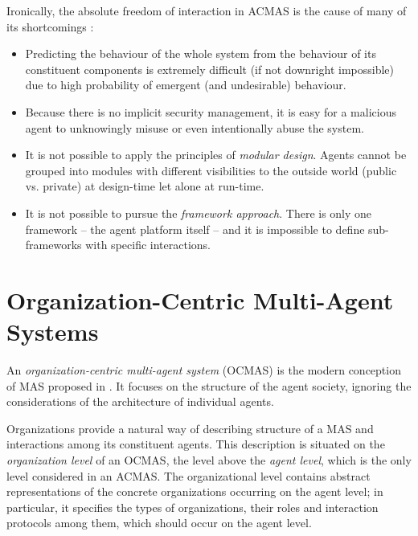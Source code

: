 Ironically, the absolute freedom of interaction in ACMAS is the cause of many of its shortcomings \cite{Ferber03}:
\begin{itemize}
	\item Predicting the behaviour of the whole system from the behaviour of its constituent components is extremely difficult (if not downright impossible) due to high probability of emergent (and undesirable) behaviour.
	\item Because there is no implicit security management, it is easy for a malicious agent to unknowingly misuse or even intentionally abuse the system.
	\item It is not possible to apply the principles of \textit{modular design}. Agents cannot be grouped into modules with different visibilities to the outside world (public vs. private) at design-time let alone at run-time.
	\item It is not possible to pursue the \textit{framework approach}. There is only one framework -- the agent platform itself -- and it is impossible to define sub-frameworks with specific interactions.
\end{itemize}

\section{Organization-Centric Multi-Agent Systems}

An \textit{organization-centric multi-agent system} (OCMAS) is the modern conception of MAS proposed in \cite{Ferber03}.
It focuses on the structure of the agent society, ignoring the considerations of the architecture of individual agents.

Organizations provide a natural way of describing structure of a MAS and interactions among its constituent agents.
This description is situated on the \textit{organization level} of an OCMAS, the level above the \textit{agent level}, which is the only level considered in an ACMAS.
The organizational level contains abstract representations of the concrete organizations occurring on the agent level; in particular, it specifies the types of organizations, their roles and interaction protocols among them, which should occur on the agent level.


